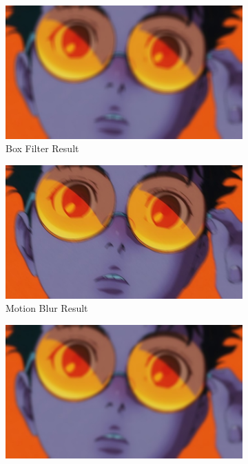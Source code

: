 \documentclass[12pt,a4paper]{article}
\begin{document}
\begin{figure}[H]
  \centering
  \begin{subfigure}[b]{0.45\textwidth}
    \includegraphics[width=\textwidth]{blurring/box_blur_15x15.jpg}
    \caption{Box Filter Result}
  \end{subfigure}
  \hfill
  \begin{subfigure}[b]{0.45\textwidth}
    \includegraphics[width=\textwidth]{blurring/motion_blur_45deg.jpg}
    \caption{Motion Blur Result}
  \end{subfigure}
  \vspace{1em}
  \begin{subfigure}[b]{0.45\textwidth}
    \includegraphics[width=\textwidth]{blurring/gaussian_blur_15x15.jpg}

\end{subfigure}
\end{figure}
\end{document}

